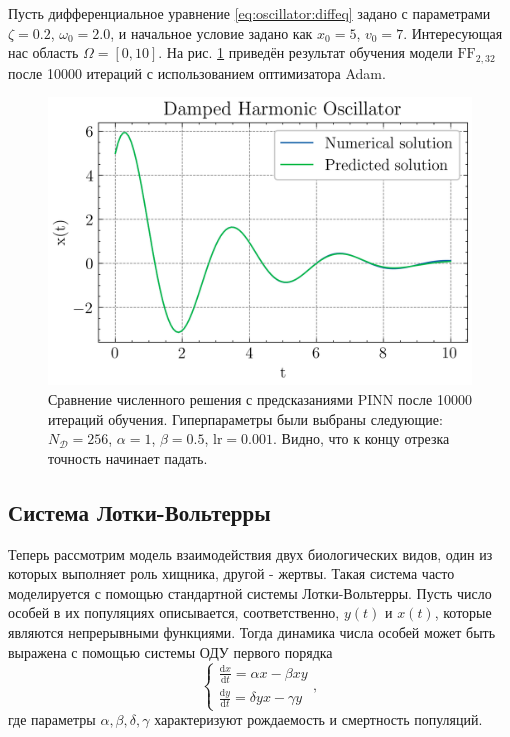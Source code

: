 \documentclass[a4paper, 12pt]{article}
\begin{document}
Пусть дифференциальное уравнение \ref{eq:oscillator:diffeq} задано с параметрами $\zeta = 0.2$, $\omega_0 = 2.0$, и начальное условие задано как $x_0 = 5$, $v_0 = 7$. Интересующая нас область $\Omega = [0, 10]$. На рис. \ref{fig:oscillator:solution} приведён результат обучения модели $\mathrm{FF}_{2, 32}$ после 10000 итераций с использованием оптимизатора Adam.

\begin{figure}
    \centering
    \includegraphics{../Differential Equation Solution/images/oscillator/Damped Harmonic Oscillator.png}
    \caption{Сравнение численного решения с предсказаниями PINN после 10000 итераций обучения. Гиперпараметры были выбраны следующие: $N_\mathcal{D} = 256$, $\alpha = 1$, $\beta = 0.5$, $\mathrm{lr} = 0.001$. Видно, что к концу отрезка точность начинает падать.}
    \label{fig:oscillator:solution}
\end{figure}

\subsection{Система Лотки-Вольтерры} \label{subsection:lotkavolterra}

Теперь рассмотрим модель взаимодействия двух биологических видов, один из которых выполняет роль хищника, другой - жертвы. Такая система часто моделируется с помощью стандартной системы Лотки-Вольтерры. Пусть число особей в их популяциях описывается, соответственно, $y(t)$ и $x(t)$, которые являются непрерывными функциями. Тогда динамика числа особей может быть выражена с помощью системы ОДУ первого порядка
\begin{equation} \label{eq:lotkavolterra:diffeq}
\begin{cases}
    \frac{\mathrm{d}x}{\mathrm{d}t} = \alpha x - \beta x y \\
    \frac{\mathrm{d}y}{\mathrm{d}t} = \delta y x - \gamma y
\end{cases},
\end{equation}
где параметры $\alpha, \beta, \delta, \gamma$ характеризуют рождаемость и смертность популяций.
\end{document}
